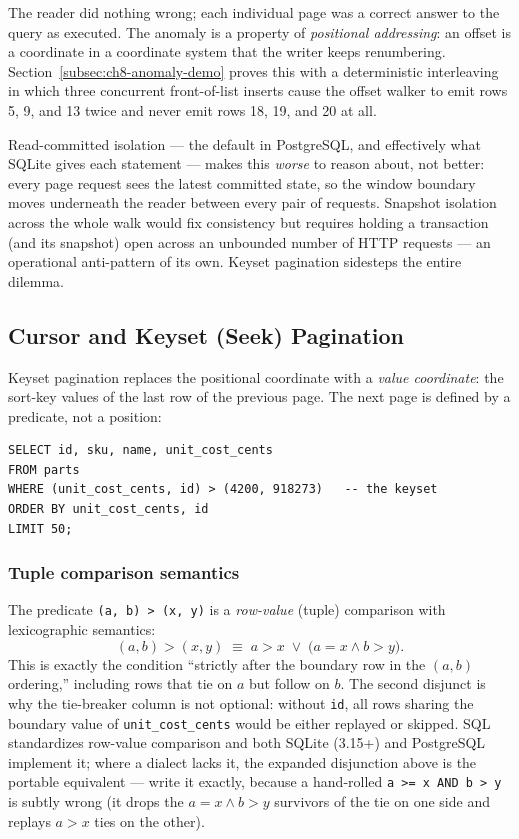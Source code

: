 The reader did nothing wrong; each individual page was a correct answer to
the query as executed. The anomaly is a property of \emph{positional
addressing}: an offset is a coordinate in a coordinate system that the writer
keeps renumbering. Section~\ref{subsec:ch8-anomaly-demo} proves this with a
deterministic interleaving in which three concurrent front-of-list inserts
cause the offset walker to emit rows 5, 9, and 13 twice and never emit rows
18, 19, and 20 at all.

\begin{warningbox}
Read-committed isolation --- the default in PostgreSQL, and effectively what
SQLite gives each statement --- makes this \emph{worse} to reason about, not
better: every page request sees the latest committed state, so the window
boundary moves underneath the reader between every pair of requests.
Snapshot isolation across the whole walk would fix consistency but requires
holding a transaction (and its snapshot) open across an unbounded number of
HTTP requests --- an operational anti-pattern of its own. Keyset pagination
sidesteps the entire dilemma.
\end{warningbox}

\subsection{Cursor and Keyset (Seek) Pagination}
\label{subsec:ch8-keyset}

Keyset pagination replaces the positional coordinate with a \emph{value
coordinate}: the sort-key values of the last row of the previous page. The
next page is defined by a predicate, not a position:

\begin{verbatim}
SELECT id, sku, name, unit_cost_cents
FROM parts
WHERE (unit_cost_cents, id) > (4200, 918273)   -- the keyset
ORDER BY unit_cost_cents, id
LIMIT 50;
\end{verbatim}

\subsubsection{Tuple comparison semantics}

The predicate \texttt{(a, b) > (x, y)} is a \emph{row-value} (tuple)
comparison with lexicographic semantics:
\[
(a, b) > (x, y) \;\equiv\; a > x \;\lor\; \big(a = x \land b > y\big).
\]
This is exactly the condition ``strictly after the boundary row in the
$(a,b)$ ordering,'' including rows that tie on $a$ but follow on $b$. The
second disjunct is why the tie-breaker column is not optional: without
\texttt{id}, all rows sharing the boundary value of
\texttt{unit\_cost\_cents} would be either replayed or skipped. SQL
standardizes row-value comparison and both SQLite (3.15+) and PostgreSQL
implement it; where a dialect lacks it, the expanded disjunction above is
the portable equivalent --- write it exactly, because a hand-rolled
\texttt{a >= x AND b > y} is subtly wrong (it drops the $a = x \land b > y$
survivors of the tie on one side and replays $a > x$ ties on the other).

